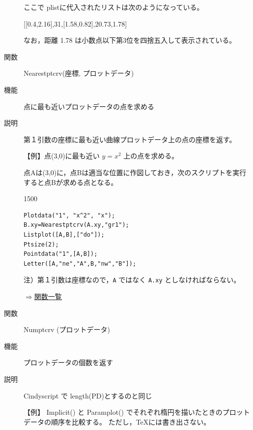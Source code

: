\documentclass[papersize,a4paper,12pt,uplatex]{jsarticle}
\begin{document}
\begin{description}
ここで plistに代入されたリストは次のようになっている。

\hspace{10mm}[[0.4,2.16],31,[1.58,0.82],20.73,1.78] 

なお，距離 1.78 は小数点以下第3位を四捨五入して表示されている。

\vspace{\baselineskip}
\hypertarget{nearestptcrv}{}
\item[関数]Nearestptcrv(座標, プロットデータ)
\item[機能]点に最も近いプロットデータの点を求める
\item[説明]第１引数の座標に最も近い曲線プロットデータ上の点の座標を返す。

\vspace{\baselineskip}
【例】点(3,0)に最も近い $y=x^2$ 上の点を求める。

点Aは(3,0)に，点Bは適当な位置に作図しておき，次のスクリプトを実行すると点Bが求める点となる。

\begin{layer}{150}{0}
\end{layer}

\begin{verbatim}
Plotdata("1", "x^2", "x");
B.xy=Nearestptcrv(A.xy,"gr1");
Listplot([A,B],["do"]);
Ptsize(2);
Pointdata("1",[A,B]);
Letter([A,"ne","A",B,"nw","B"]);
\end{verbatim}

\vspace{\baselineskip}
\vspace{\baselineskip}
注）第１引数は座標なので，\verb|A| ではなく \verb|A.xy| としなければならない。

\begin{flushright}\hyperlink{functionlist}{$\Rightarrow$関数一覧}\end{flushright}

\hypertarget{numptcrv}{}
\item[関数]Numptcrv (プロットデータ)
\item[機能]プロットデータの個数を返す
\item[説明]Cindyscript で length(PD)とするのと同じ

\vspace{\baselineskip}
【例】 Implicit() と Paramplot() でそれぞれ楕円を描いたときのプロットデータの順序を比較する。
ただし，TeXには書き出さない。


\end{description}
\end{document}
